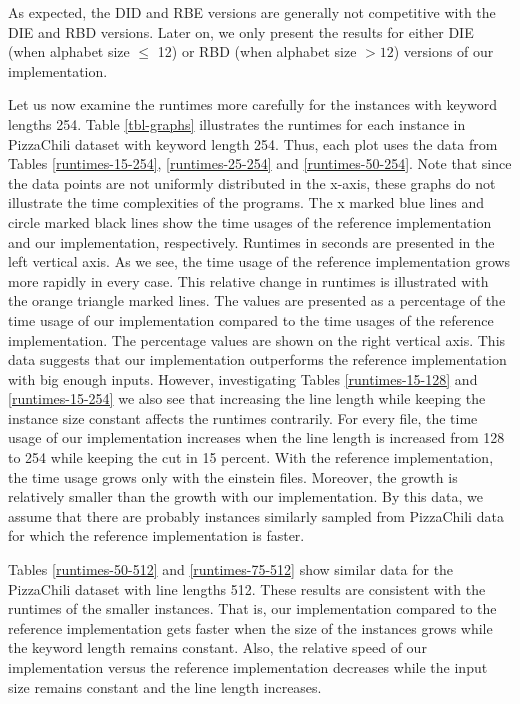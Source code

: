 \documentclass[english,twoside,censored,csm,algorithms-track-2020]{HYthesisML}
\theoremstyle{plain}
\theoremstyle{definition}
\begin{document}
As expected, the DID and RBE versions are generally not competitive with the DIE
and RBD versions.
Later on, we only present the results for either DIE (when alphabet size $\leq$ 12)
or RBD (when alphabet size $>12$) versions of our implementation.

Let us now examine the runtimes more carefully for the instances with keyword lengths 254.
Table \ref{tbl-graphs} illustrates the runtimes for each instance in PizzaChili dataset
with keyword length 254.
Thus, each plot uses the data from Tables
\ref{runtimes-15-254}, \ref{runtimes-25-254} and \ref{runtimes-50-254}.
Note that since the data points are not uniformly distributed in the x-axis,
these graphs do not illustrate the time complexities of the programs. 
The x marked blue lines and circle marked black lines show the time usages of the reference
implementation and our implementation, respectively. Runtimes in seconds are presented in the
left vertical axis. As we see, the time usage of the reference implementation grows
more rapidly in every case. This relative change in runtimes is illustrated with
the orange triangle marked lines.
The values are presented as a percentage of the time usage of our implementation
compared to the time usages of the reference implementation.
The percentage values are shown on the right vertical axis.
This data suggests that our implementation outperforms the reference implementation
with big enough inputs. However, investigating Tables \ref{runtimes-15-128} and
\ref{runtimes-15-254} we also see
that increasing the line length while keeping the instance size constant affects
the runtimes contrarily. For every file, the time usage of our implementation
increases when the line length is increased from 128 to 254 while keeping the
cut in 15 percent. With the reference implementation, the time usage grows only
with the einstein files. Moreover, the growth is relatively smaller than the growth with
our implementation. By this data, we assume that there are probably instances similarly sampled
from PizzaChili data for which the reference implementation is faster.

Tables \ref{runtimes-50-512} and \ref{runtimes-75-512} show similar data for the PizzaChili
dataset with line lengths 512. These results are consistent with the runtimes of the smaller instances.
That is, our implementation compared to the reference implementation gets faster when the size of
the instances grows while the keyword length remains constant. Also, the relative speed of our
implementation versus the reference implementation decreases while the input size remains constant and the
line length increases. 
\end{document}
